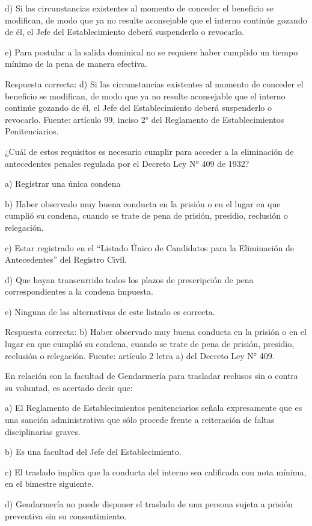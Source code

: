 \documentclass[letterpaper, 11pt]{article}
\begin{document}
d) Si las circunstancias existentes al momento de conceder el beneficio se modifican, de
modo que ya no resulte aconsejable que el interno continúe gozando de él, el Jefe del
Establecimiento deberá suspenderlo o revocarlo.

e) Para postular a la salida dominical no se requiere haber cumplido un tiempo mínimo de
la pena de manera efectiva.

Respuesta correcta:
d) Si las circunstancias existentes al momento de conceder el
beneficio se modifican, de modo que ya no resulte aconsejable que el interno continúe
gozando de él, el Jefe del Establecimiento deberá suspenderlo o revocarlo.
Fuente: artículo 99, inciso 2° del Reglamento de Establecimientos Penitenciarios.

¿Cuál de estos requisitos es necesario cumplir para acceder a la eliminación de
antecedentes penales regulada por el Decreto Ley N° 409 de 1932?

a) Registrar una única condena

b) Haber observado muy buena conducta en la prisión o en el lugar en que cumplió su
condena, cuando se trate de pena de prisión, presidio, reclusión o relegación.

c) Estar registrado en el “Listado Único de Candidatos para la Eliminación de Antecedentes”
del Registro Civil.

d) Que hayan transcurrido todos los plazos de prescripción de pena correspondientes a la
condena impuesta.

e) Ninguna de las alternativas de este listado es correcta.

Respuesta correcta:
b) Haber observado muy buena conducta en la prisión o en el lugar
en que cumplió su condena, cuando se trate de pena de prisión, presidio, reclusión o
relegación.
Fuente: artículo 2 letra a) del Decreto Ley N° 409.


En relación con la facultad de Gendarmería para trasladar reclusos sin o contra su
voluntad, es acertado decir que:

a) El Reglamento de Establecimientos penitenciarios señala expresamente que es una
sanción administrativa que sólo procede frente a reiteración de faltas disciplinarias graves.

b) Es una facultad del Jefe del Establecimiento.

c) El traslado implica que la conducta del interno sea calificada con nota mínima, en el
bimestre siguiente.

d) Gendarmería no puede disponer el traslado de una persona sujeta a prisión preventiva
sin su consentimiento.
\end{document}
